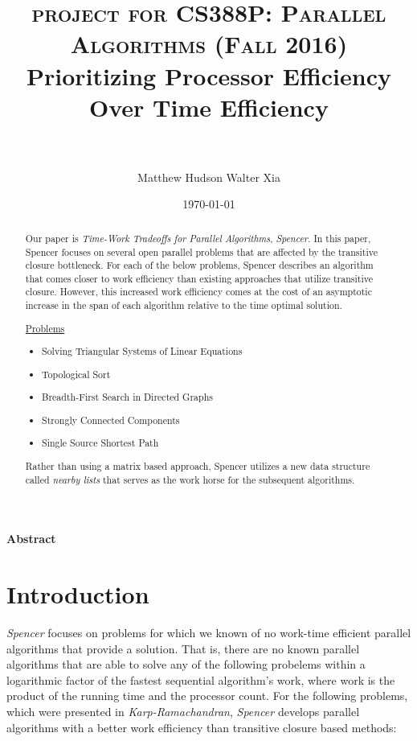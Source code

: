 \documentclass[paper=a4, fontsize=11pt]{scrartcl} %
\title{	
\normalfont \normalsize 
\textsc{project for CS388P: Parallel Algorithms (Fall 2016)} 
\horrule{0.5pt} \\[0.4cm] %
\huge Prioritizing Processor Efficiency Over Time Efficiency \\ %
\horrule{2pt} \\[0.5cm] %
}
\author{Matthew Hudson \hspace{5mm} Walter Xia }	%
\date{\normalsize\today} %
\numberwithin{equation}{section} %
\numberwithin{figure}{section} %
\numberwithin{table}{section} %
\begin{document}
\maketitle %

\justify
\textbf{Abstract}

\begin{abstract}
Our paper is \textit{Time-Work Tradeoffs for Parallel Algorithms}, \textit{Spencer\cite{S97}}. In this paper, Spencer focuses on several open parallel problems that are affected by the transitive closure bottleneck. For each of the below problems, Spencer describes an algorithm that comes closer to work efficiency than existing approaches that utilize transitive closure. However, this increased work efficiency comes at the cost of an asymptotic increase in the span of each algorithm relative to the time optimal solution.  

\underline{Problems}
\begin{itemize}
\item Solving Triangular Systems of Linear Equations
\item Topological Sort
\item Breadth-First Search in Directed Graphs
\item Strongly Connected Components
\item Single Source Shortest Path
\end{itemize}

Rather than using a matrix based approach, Spencer utilizes a new data structure called \textit{nearby lists} that serves as the work horse for the subsequent algorithms. \\
\end{abstract}


\section{Introduction}

\textit{Spencer\cite{S97}} focuses on problems for which we known of no work-time efficient parallel algorithms that provide a solution. That is, there are no known parallel algorithms that are able to solve any of the following probelems within a logarithmic factor of the fastest sequential algorithm's work, where work is the product of the running time and the processor count. For the following problems, which were presented in \textit{Karp-Ramachandran\cite{KR90}}, \textit{Spencer\cite{S97}} develops parallel algorithms with a better work efficiency than transitive closure based methods: 
\end{document}
